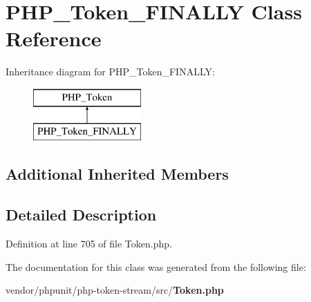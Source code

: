\section{P\+H\+P\+\_\+\+Token\+\_\+\+F\+I\+N\+A\+L\+L\+Y Class Reference}
\label{class_p_h_p___token___f_i_n_a_l_l_y}
Inheritance diagram for P\+H\+P\+\_\+\+Token\+\_\+\+F\+I\+N\+A\+L\+L\+Y\+:\begin{figure}[H]
\begin{center}
\leavevmode
\includegraphics[height=2.000000cm]{class_p_h_p___token___f_i_n_a_l_l_y}
\end{center}
\end{figure}
\subsection*{Additional Inherited Members}


\subsection{Detailed Description}


Definition at line 705 of file Token.\+php.



The documentation for this class was generated from the following file\+:\begin{DoxyCompactItemize}
\item 
vendor/phpunit/php-\/token-\/stream/src/{\bf Token.\+php}\end{DoxyCompactItemize}
